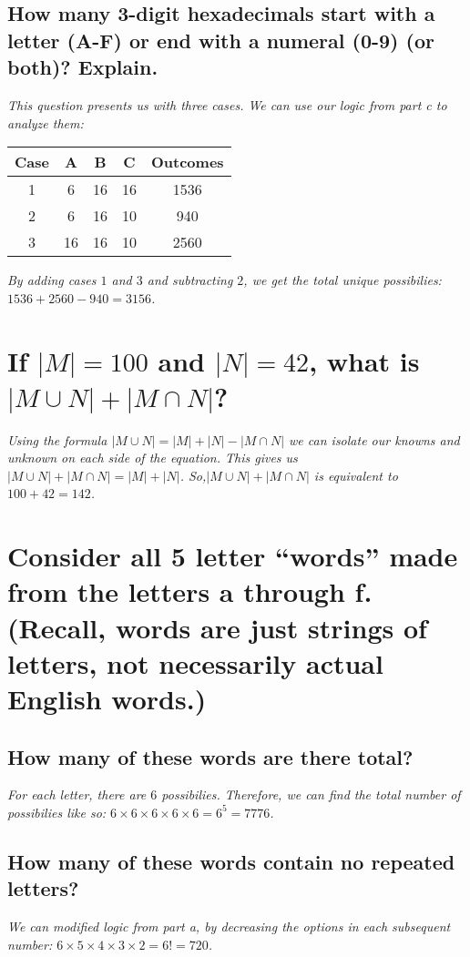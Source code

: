\documentclass{article}
\begin{document}
\subsection{How many 3-digit hexadecimals start with a letter (A-F) or end with a numeral (0-9) (or both)? Explain.}
\hspace{1cm}\textit{This question presents us with three cases. We can use our logic from part c to
    analyze them:}
\begin{center}
    \begin{tabular}{c|c|c|c|c}
        Case & A & B & C & Outcomes \\
        \hline
        1 & 6 & 16 & 16 & 1536 \\
        \hline
        2 & 6 & 16 & 10 & 940 \\
        \hline
        3 & 16 & 16 & 10 & 2560 \\
        \hline
    \end{tabular}
\end{center}
\hspace{1cm}\textit{By adding cases $1$ and $3$ and subtracting $2$, we get the total unique
    possibilies: $1536+2560-940 = 3156$.}

\section{If $|M| = 100$ and $|N| = 42$, what is $|M\cup N|+|M\cap N|$?}
\hspace{1cm}\textit{Using the formula $|M\cup N|=|M|+|N|-|M\cap N|$ we can isolate our knowns and unknown
    on each side of the equation. This gives us $|M\cup N|+|M\cap N| = |M|+|N|$. So,$|M\cup N|+|M\cap N|$
    is equivalent to $100+42 = 142$.}

\section{Consider all 5 letter “words” made from the letters a through f.
    (Recall, words are just strings of letters, not necessarily actual English words.)}
\subsection{How many of these words are there total?}
\hspace{1cm}\textit{For each letter, there are $6$ possibilies. Therefore, we can find the total number
    of possibilies like so: $6\times 6\times 6\times 6\times 6 = 6^5 = 7776$.}
\subsection{How many of these words contain no repeated letters?}
\hspace{1cm}\textit{We can modified logic from part a, by decreasing the options in each subsequent number:
    $6\times 5\times 4\times 3\times 2 = 6! = 720$.}
\end{document}

